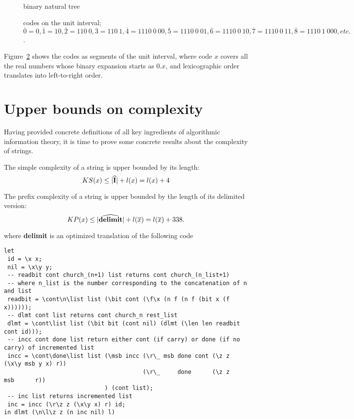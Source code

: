 \documentclass{article}
\newcommand{\brr}[1]{\overline{#1}}
\newcommand{\CI}{{\bf I}}
\begin{document}
\begin{figure}
\epsfxsize=8cm 
\caption{binary natural tree}
\label{natree}
\end{figure}

\begin{figure}
\epsfxsize=13cm 
\caption{codes on the unit interval;
$\brr{0} = 0, \brr{1} = 10, \brr{2} = 110\ 0, \brr{3} = 110\ 1, \brr{4} = 1110\ 0\ 00, \brr{5} = 1110\ 0\ 01, \brr{6} = 1110\ 0\ 10, \brr{7} = 1110\ 0\ 11, \brr{8} = 1110\ 1\ 000, etc.$.}
\label{kraft}
\end{figure}

Figure~\ref{kraft} shows the codes as segments of the unit interval,
where code $x$ covers all the real numbers whose binary expansion starts
as $0.x$, and lexicographic order translates into left-to-right order.


\section{Upper bounds on complexity}
Having provided concrete definitions of all key ingredients of algorithmic
information theory, it is time to prove some concrete results about
the complexity of strings.

The simple complexity of a string is upper bounded by its length:
\[ KS(x) \leq |\widehat{\CI}|+l(x) = l(x)+4 \]

The prefix complexity of a string is
upper bounded by the length of its delimited version:
\[ KP(x) \leq |\widehat{{\bf delimit}}|+l(\brr{x}) = l(\brr{x})+338. \]

where {\bf delimit} is an optimized translation
of the following code
{\small
\begin{verbatim}
let
 id = \x x;
 nil = \x\y y;
 -- readbit cont church_(n+1) list returns cont church_(n_list+1)
 -- where n_list is the number corresponding to the concatenation of n and list
 readbit = \cont\n\list list (\bit cont (\f\x (n f (n f (bit x (f x))))));
 -- dlmt cont list returns cont church_n rest_list
 dlmt = \cont\list list (\bit bit (cont nil) (dlmt (\len len readbit cont id)));
 -- incc cont done list return either cont (if carry) or done (if no carry) of incremented list
 incc = \cont\done\list list (\msb incc (\r\_ msb done cont (\z z (\x\y msb y x) r))
                                        (\r\_     done      (\z z       msb      r))
                             ) (cont list);
 -- inc list returns incremented list
 inc = incc (\r\z z (\x\y x) r) id;
in dlmt (\n\l\z z (n inc nil) l)
\end{verbatim}
}
\end{document}
